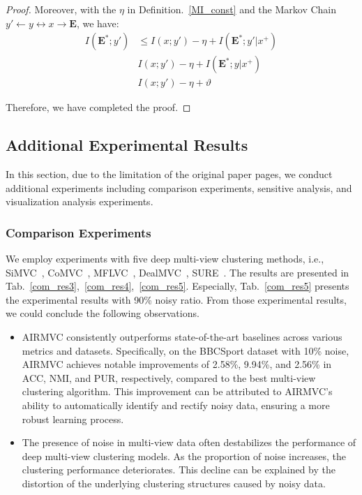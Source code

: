 \documentclass{article}
\theoremstyle{plain}
\theoremstyle{definition}
\theoremstyle{remark}
\begin{document}
\begin{proof}
Moreover, with the $\eta$ in Definition.~\ref{MI_const} and the Markov Chain $y' \gets y \leftrightarrow x \to \textbf{E}$, we have:
\begin{equation}
\begin{aligned}
I(\textbf{E}^*;y') &\le I(x;y')-\eta + I(\textbf{E}^*;y'|x^+)\\
                   &I(x;y')-\eta + I(\textbf{E}^*;y|x^+)\\
                   &I(x;y')-\eta+\vartheta
\end{aligned}
\end{equation}

Therefore, we have completed the proof.

\end{proof}


\subsection{Additional Experimental Results}\label{add_exp}

In this section, due to the limitation of the original paper pages, we conduct additional experiments including comparison experiments, sensitive analysis, and visualization analysis experiments.

\subsubsection{Comparison Experiments}
We employ experiments with five deep multi-view clustering methods, i.e., SiMVC~\cite{SiMVC}, CoMVC~\cite{SiMVC}, MFLVC~\cite{MFLVC}, DealMVC~\cite{DealMVC}, SURE~\cite{SURE}. The results are presented in Tab.~\ref{com_res3},~\ref{com_res4},~\ref{com_res5}. Especially, Tab.~\ref{com_res5} presents the experimental results with 90\% noisy ratio. From those experimental results, we could conclude the following observations.

\begin{itemize}
    \item AIRMVC consistently outperforms state-of-the-art baselines across various metrics and datasets. Specifically, on the BBCSport dataset with 10\% noise, AIRMVC achieves notable improvements of 2.58\%, 9.94\%, and 2.56\% in ACC, NMI, and PUR, respectively, compared to the best multi-view clustering algorithm. This improvement can be attributed to AIRMVC's ability to automatically identify and rectify noisy data, ensuring a more robust learning process.  
    \item The presence of noise in multi-view data often destabilizes the performance of deep multi-view clustering models. As the proportion of noise increases, the clustering performance deteriorates. This decline can be explained by the distortion of the underlying clustering structures caused by noisy data.
\end{itemize}
\end{document}
